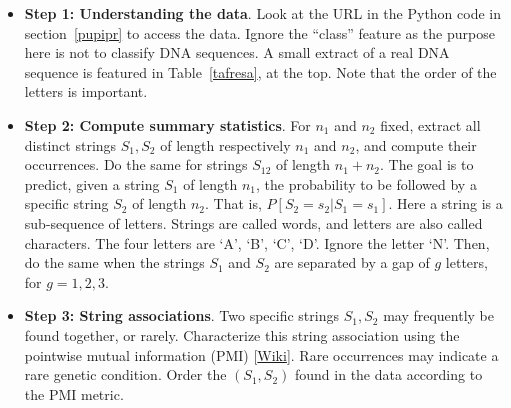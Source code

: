 \documentclass[oneside,10pt]{book}
\begin{document}
\begin{itemize}
\item[] {\bf Step 1:  Understanding the data}. Look at the URL in the Python code in section~\ref{pupipr} to access the data. Ignore the
 ``class'' feature as the purpose here is not to classify DNA sequences. A small extract of a real DNA sequence is featured in Table~\ref{tafresa}, at the top. Note that the order of the letters is important.
 \vspace{1ex}
\item[] {\bf Step 2: Compute summary statistics}.  For $n_1$ and $n_2$ fixed, extract all distinct strings $S_1, S_2$ of length respectively $n_1$ and $n_2$,
 and compute their occurrences. Do the same for strings $S_{12}$ of length $n_1+n_2$. The goal is to predict, given a string $S_1$ of length $n_1$, the probability
 to be followed by a specific string $S_2$ of length $n_2$. That is, $P[S_2 = s_2 | S_1 = s_1]$. Here a string is a sub-sequence of letters. Strings are  called words, and letters are also called characters.
 The four letters are `A', `B', `C', `D'. Ignore the letter `N'. Then, do the same when the strings $S_1$ and $S_2$ are separated by a gap of
 $g$ letters, for $g=1,2,3$.
\vspace{1ex} 
\item[] {\bf Step 3: String associations}. Two specific strings $S_1, S_2$ may frequently be found together, or rarely. Characterize this  string association using the \textcolor{index}{pointwise mutual information} (PMI) [\href{https://en.wikipedia.org/wiki/Pointwise_mutual_information}{Wiki}]. Rare
 occurrences may indicate a rare genetic condition. Order the $(S_1, S_2)$ found in the data according to the PMI metric.


\end{itemize}
\end{document}
